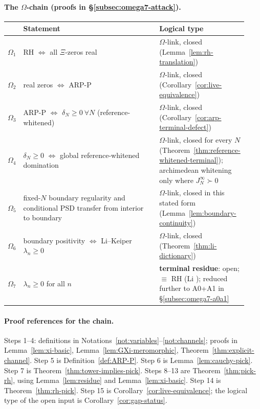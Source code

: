 \documentclass[11pt]{amsart}
\theoremstyle{definition}
\theoremstyle{remark}
\theoremstyle{definition}
\begin{document}
\paragraph{The $\Omega$-chain (proofs in \S\ref{subsec:omega7-attack}).}

{\small
\begin{longtable}{@{}p{0.05\linewidth}p{0.60\linewidth}p{0.28\linewidth}@{}}
\toprule
 & Statement & Logical type \\
\midrule
\endhead
$\Omega_1$ & RH $\Longleftrightarrow$ all $\Xi$-zeros real & $\Omega$-link, closed
(Lemma~\ref{lem:rh-translation}) \\
$\Omega_2$ & real zeros $\Longleftrightarrow$ ARP-P & $\Omega$-link, closed
(Corollary~\ref{cor:live-equivalence}) \\
$\Omega_3$ & ARP-P $\Longleftrightarrow$ $\delta_N\ge0\ \forall N$ (reference-whitened) & $\Omega$-link,
closed (Corollary~\ref{cor:arp-terminal-defect}) \\
$\Omega_4$ & $\delta_N\ge0$ $\Longleftrightarrow$ global reference-whitened domination & $\Omega$-link,
closed for every $N$ (Theorem~\ref{thm:reference-whitened-terminal}); archimedean whitening only where
$J_N^\infty\succ0$ \\
$\Omega_5$ & fixed-$N$ boundary regularity and conditional PSD transfer from interior to boundary &
$\Omega$-link, closed in this stated form (Lemma~\ref{lem:boundary-continuity}) \\
$\Omega_6$ & boundary positivity $\Longleftrightarrow$ Li--Keiper $\lambda_n\ge0$ & $\Omega$-link,
closed (Theorem~\ref{thm:li-dictionary}) \\
$\Omega_7$ & $\lambda_n\ge0$ for all $n$ & \textbf{terminal residue}: open; $\equiv$ RH (Li
\cite{Li}); reduced further to A0+A1 in \S\ref{subsec:omega7-a0a1} \\
\bottomrule
\end{longtable}
}

\paragraph{Proof references for the chain.}
Steps 1--4: definitions in Notations~\ref{not:variables}--\ref{not:channels}; proofs in
Lemma~\ref{lem:xi-basic}, Lemma~\ref{lem:GXi-meromorphic}, Theorem~\ref{thm:explicit-channel}.  Step 5 is
Definition~\ref{def:ARP-P}.  Step 6 is Lemma~\ref{lem:cauchy-pick}.  Step 7 is
Theorem~\ref{thm:tower-implies-pick}.  Steps 8--13 are Theorem~\ref{thm:pick-rh}, using
Lemma~\ref{lem:residue} and Lemma~\ref{lem:xi-basic}.  Step 14 is
Theorem~\ref{thm:rh-pick}.  Step 15 is Corollary~\ref{cor:live-equivalence}; the logical type of the open
input is Corollary~\ref{cor:gap-status}.
\end{document}

